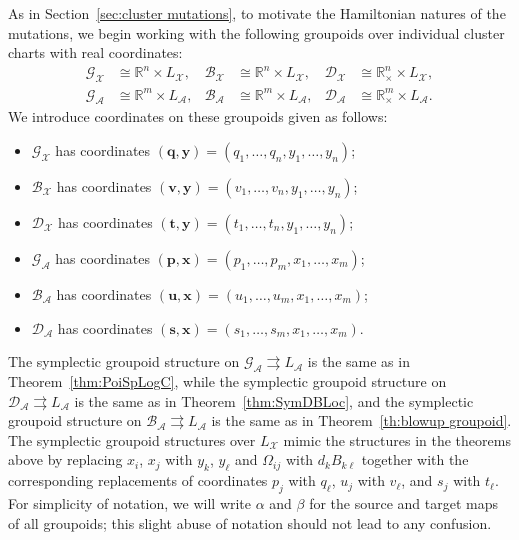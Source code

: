 \documentclass{amsart}
\numberwithin{equation}{section}
\newcommand{\bfp}{{\boldsymbol{p}}}
\newcommand{\bfq}{{\boldsymbol{q}}}
\newcommand{\bfs}{{\boldsymbol{s}}}
\newcommand{\bft}{{\boldsymbol{t}}}
\newcommand{\bfu}{{\boldsymbol{u}}}
\newcommand{\bfv}{{\boldsymbol{v}}}
\newcommand{\bfx}{{\boldsymbol{x}}}
\newcommand{\bfy}{{\boldsymbol{y}}}
\newcommand{\cA}{\mathcal{A}}
\newcommand{\cB}{\mathcal{B}}
\newcommand{\cD}{\mathcal{D}}
\newcommand{\cG}{\mathcal{G}}
\newcommand{\cX}{\mathcal{X}}
\newcommand{\RR}{\mathbb{R}}
\newcommand{\rra}{\rightrightarrows}
\begin{document}
As in Section~\ref{sec:cluster mutations}, to motivate the Hamiltonian natures of the mutations, we begin working with the following groupoids over individual cluster charts with real coordinates: 
\begin{align*}
  \cG_\cX&\cong\RR^n\times L_\cX,& \cB_\cX&\cong\RR^n\times L_\cX,& \cD_\cX&\cong\RR_\times^n\times L_\cX,\\
  \cG_\cA&\cong\RR^m\times L_\cA,& \cB_\cA&\cong\RR^m\times L_\cA,& \cD_\cA&\cong\RR_\times^m\times L_\cA.
\end{align*}
We introduce coordinates on these groupoids given as follows:
\begin{itemize}
  \item $\cG_\cX$ has coordinates $(\bfq,\bfy)=(q_1,\ldots,q_n,y_1,\ldots,y_n)$; 
  \item $\cB_\cX$ has coordinates $(\bfv,\bfy)=(v_1,\ldots,v_n,y_1,\ldots,y_n)$;
  \item $\cD_\cX$ has coordinates $(\bft,\bfy)=(t_1,\ldots,t_n,y_1,\ldots,y_n)$; 
  \item $\cG_\cA$ has coordinates $(\bfp,\bfx)=(p_1,\ldots,p_m,x_1,\ldots,x_m)$; 
  \item $\cB_\cA$ has coordinates $(\bfu,\bfx)=(u_1,\ldots,u_m,x_1,\ldots,x_m)$;
  \item $\cD_\cA$ has coordinates $(\bfs,\bfx)=(s_1,\ldots,s_m,x_1,\ldots,x_m)$.
\end{itemize}
The symplectic groupoid structure on $\cG_\cA \rra L_\cA$ is the same as in Theorem~\ref{thm:PoiSpLogC}, while the symplectic groupoid structure on $\cD_\cA \rra L_\cA$ is the same as in Theorem~\ref{thm:SymDBLoc}, and the symplectic groupoid structure on $\cB_\cA \rra L_\cA$ is the same as in Theorem~\ref{th:blowup groupoid}.
The symplectic groupoid structures over $L_\cX$ mimic the structures in the theorems above by replacing $x_i$, $x_j$ with $y_k$, $y_\ell$ and $\Omega_{ij}$ with $d_kB_{k\ell}$ together with the corresponding replacements of coordinates $p_j$ with $q_\ell$, $u_j$ with $v_\ell$, and $s_j$ with $t_\ell$.
For simplicity of notation, we will write $\alpha$ and $\beta$ for the source and target maps of all groupoids; this slight abuse of notation should not lead to any confusion.
\end{document}
